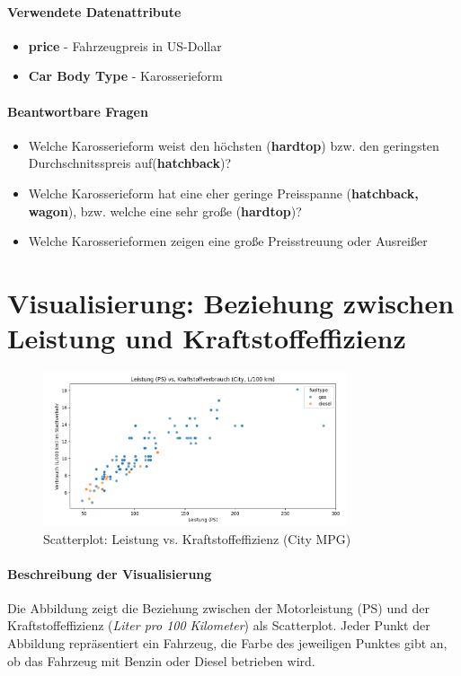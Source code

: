 \documentclass[a4paper,12pt]{article}
\begin{document}
\paragraph{Verwendete Datenattribute}
\begin{itemize}
  \item \textbf{price} - Fahrzeugpreis in US-Dollar
  \item \textbf{Car Body Type} - Karosserieform 
\end{itemize}

\hfill \break

\paragraph{Beantwortbare Fragen}
\begin{itemize}
  \item Welche Karosserieform weist den höchsten (\textbf{hardtop}) bzw. den geringsten Durchschnitsspreis auf(\textbf{hatchback})?
  \item Welche Karosserieform hat eine eher geringe Preisspanne (\textbf{hatchback, wagon}), bzw. welche eine sehr große (\textbf{hardtop})?
  \item Welche Karosserieformen zeigen eine große Preisstreuung oder Ausreißer
\end{itemize}

\section{Visualisierung: Beziehung zwischen Leistung und Kraftstoffeffizienz}
\begin{figure}[H]
    \centering
    \includegraphics[width=0.8\textwidth]{../images/leistung_vs_kraftstoffeffizienz_lp100.png} %
    \caption{Scatterplot: Leistung vs. Kraftstoffeffizienz (City MPG)}
    \label{fig:vis2}
\end{figure}

\paragraph{Beschreibung der Visualisierung} \break
Die Abbildung zeigt die Beziehung zwischen der Motorleistung (PS) und der Kraftstoffeffizienz (\textit{Liter pro 100 Kilometer}) als Scatterplot.
Jeder Punkt der Abbildung repräsentiert ein Fahrzeug, die Farbe des jeweiligen Punktes gibt an, ob das Fahrzeug mit Benzin oder Diesel betrieben wird.
\end{document}
